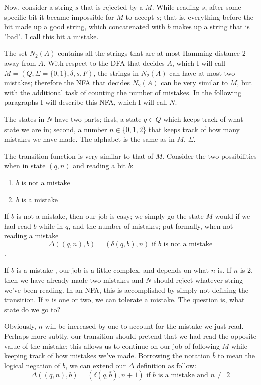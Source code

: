 \documentclass[11pt]{article}
\begin{document}
Now, consider a string $s$ that is rejected by a $M$. While reading $s$, after some specific bit it became impossible for $M$ to accept $s$; that is, everything before the bit made up a good string, which concatenated with $b$ makes up a string that is "bad". I call this bit a mistake.

The set $N_2(A)$ contains all the strings that are at most Hamming distance 2 away from $A$. With respect to the DFA that decides $A$, which I will call $M = (Q, \Sigma = \{0,1\}, \delta, s, F)$, the strings in $N_2(A)$ can have at most two mistakes; therefore the NFA that decides $N_2(A)$ can be very similar to $M$, but with the additional task of counting the number of mistakes. In the following paragraphs I will describe this NFA, which I will call $N$.  

The states in $N$ have two parts; first, a state $q \in Q$ which keeps track of what state we are in; second, a number $n \in \{0, 1, 2\}$ that keeps track of how many mistakes we have made. The alphabet is the same as in $M$, $\Sigma$.

The transition function is very similar to that of $M$. Consider the two possibilities when in state $(q, n)$ and reading a bit $b$:
\begin{enumerate}
	\item $b$ is not a mistake
	\item $b$ is a mistake
\end{enumerate}

If $b$ is not a mistake, then our job is easy; we simply go the state $M$ would if we had read $b$ while in $q$, and the number of mistakes; put formally, when not reading a mistake \[ \Delta( (q, n), b ) = (\delta( q, b), n) \text{ if $b$ is not a mistake} \].

If $b$ is a mistake , our job is a little complex, and depends on what $n$ is. If $n$ is 2, then we have already made two mistakes and $N$ should reject whatever string we've been reading. In an NFA, this is accomplished by simply not defining the transition. If $n$ is one or two, we can tolerate a mistake. The question is, what state do we go to? 

Obviously, $n$ will be increased by one to account for the mistake we just read. Perhaps more subtly, our transition should pretend that we had read the opposite value of the mistake; this allows us to continue on our job of following $M$ while keeping track of how mistakes we've made. Borrowing the notation $\overline{b}$ to mean the logical negation of $b$, we can extend our $\Delta$ definition as follow:
	\[ \Delta( (q, n), b) = (\delta(q, \overline{b}), n+1) \text{ if $b$ is a mistake and $n \neq$ 2}\]
	
\end{document}
